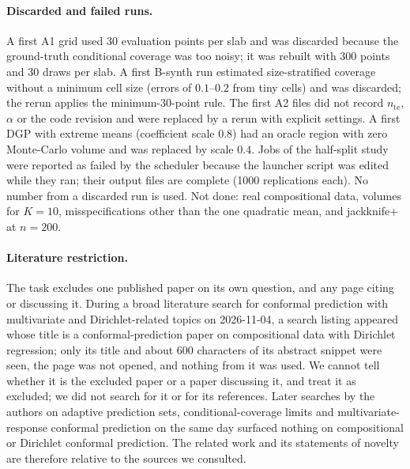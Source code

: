 \paragraph{Discarded and failed runs.}
A first A1 grid used 30 evaluation points per slab and was discarded because the ground-truth conditional coverage was too noisy; it was rebuilt with 300 points and 30 draws per slab. A first B-synth run estimated size-stratified coverage without a minimum cell size (errors of $0.1$--$0.2$ from tiny cells) and was discarded; the rerun applies the minimum-30-point rule. The first A2 files did not record $n_{\mathrm{te}}$, $\alpha$ or the code revision and were replaced by a rerun with explicit settings. A first DGP with extreme means (coefficient scale $0.8$) had an oracle region with zero Monte-Carlo volume and was replaced by scale $0.4$. Jobs of the half-split study were reported as failed by the scheduler because the launcher script was edited while they ran; their output files are complete (1000 replications each). No number from a discarded run is used. Not done: real compositional data, volumes for $K=10$, misspecifications other than the one quadratic mean, and jackknife+ at $n=200$.

\paragraph{Literature restriction.}
The task excludes one published paper on its own question, and any page citing or discussing it. During a broad literature search for conformal prediction with multivariate and Dirichlet-related topics on 2026-11-04, a search listing appeared whose title is a conformal-prediction paper on compositional data with Dirichlet regression; only its title and about 600 characters of its abstract snippet were seen, the page was not opened, and nothing from it was used. We cannot tell whether it is the excluded paper or a paper discussing it, and treat it as excluded; we did not search for it or for its references. Later searches by the authors on adaptive prediction sets, conditional-coverage limits and multivariate-response conformal prediction on the same day surfaced nothing on compositional or Dirichlet conformal prediction. The related work and its statements of novelty are therefore relative to the sources we consulted.
